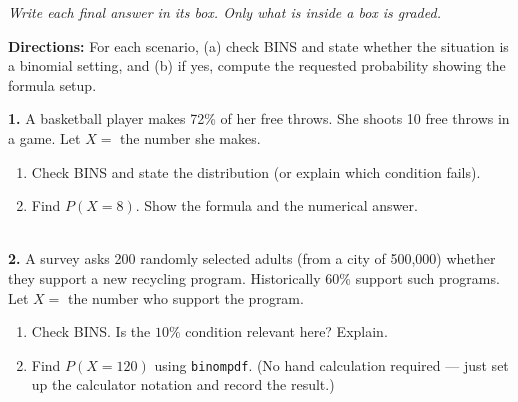 \documentclass[10pt]{article}
\begin{document}
{\small\itshape Write each final answer in its box. Only what is inside a box is graded.}\par

\vspace{0.1in}

\begin{practicebox}
\small
\textbf{Directions:} For each scenario, (a) check BINS and state whether the situation
is a binomial setting, and (b) if yes, compute the requested probability showing the
formula setup.

\vspace{10pt}
\textbf{1.} A basketball player makes 72\% of her free throws. She shoots 10 free
throws in a game. Let $X =$ the number she makes.
\begin{enumerate}[label=(\alph*), leftmargin=2em, itemsep=8pt]
  \item Check BINS and state the distribution (or explain which condition fails).\\
  \item Find $P(X = 8)$. Show the formula and the numerical answer.\\
        \writeline\\[1pt]\writeline\gradedhide{\hrulefill}\gradedright{\raisebox{-2pt}{\gradedblank[id=hw1b, type=short, points=2, answer=0.2548, check=numeric, tolerance=0.002]{1.3in}{0.2in}}}
\end{enumerate}

\vspace{8pt}
\textbf{2.} A survey asks 200 randomly selected adults (from a city of 500{,}000)
whether they support a new recycling program. Historically 60\% support such
programs. Let $X =$ the number who support the program.
\begin{enumerate}[label=(\alph*), leftmargin=2em, itemsep=8pt]
  \item Check BINS. Is the $10\%$ condition relevant here? Explain.\\
  \item Find $P(X = 120)$ using \texttt{binompdf}. (No hand calculation required ---
        just set up the calculator notation and record the result.)\\
        \writeline\gradedhide{\hrulefill}\gradedright{\raisebox{-2pt}{\gradedblank[id=hw2b, type=short, points=1, answer=0.0553, check=numeric, tolerance=0.001]{1.3in}{0.2in}}}
\end{enumerate}


\end{practicebox}
\end{document}
